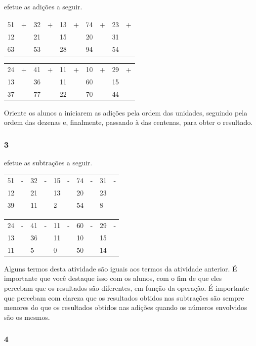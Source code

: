 efetue as adições a seguir.

\begin{longtable}[]{@{}llllllllll@{}}
\toprule
51 & + & 32 & + & 13 & + & 74 & + & 23 & +\tabularnewline
12 & & 21 & & 15 & & 20 & & 31 &\tabularnewline
63 & & 53 & & 28 & & 94 & & 54 &\tabularnewline
\bottomrule
\end{longtable}

\begin{longtable}[]{@{}llllllllll@{}}
\toprule
24 & + & 41 & + & 11 & + & 10 & + & 29 & +\tabularnewline
13 & & 36 & & 11 & & 60 & & 15 &\tabularnewline
37 & & 77 & & 22 & & 70 & & 44 &\tabularnewline
\bottomrule
\end{longtable}

Oriente os alunos a iniciarem as adições pela ordem das
unidades, seguindo pela ordem das dezenas e, finalmente, passando à das centenas,
para obter o resultado.

\subsubsection{3}\label{section-10}

efetue as subtrações a seguir.

\begin{longtable}[]{@{}llllllllll@{}}
\toprule
51 & - & 32 & - & 15 & - & 74 & - & 31 & -\tabularnewline
12 & & 21 & & 13 & & 20 & & 23 &\tabularnewline
39 & & 11 & & 2 & & 54 & & 8 &\tabularnewline
\bottomrule
\end{longtable}

\begin{longtable}[]{@{}llllllllll@{}}
\toprule
24 & - & 41 & - & 11 & - & 60 & - & 29 & -\tabularnewline
13 & & 36 & & 11 & & 10 & & 15 &\tabularnewline
11 & & 5 & & 0 & & 50 & & 14 &\tabularnewline
\bottomrule
\end{longtable}

Alguns termos desta atividade são iguais aos
termos da atividade anterior. É importante que você destaque isso com os
alunos, com o fim de que eles percebam que os resultados são diferentes,
em função da operação. É importante que percebam com clareza que os
resultados obtidos nas subtrações são sempre menores do que os
resultados obtidos nas adições quando os números envolvidos são os mesmos.

\subsubsection{4}\label{section-11}


